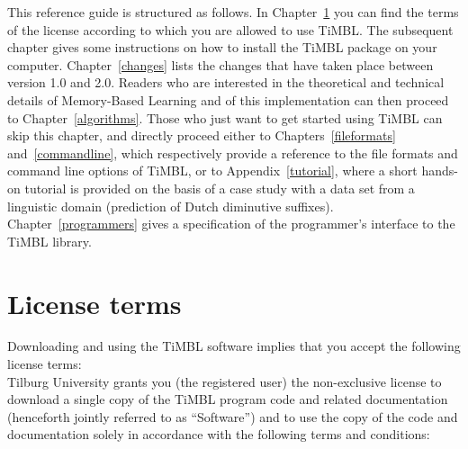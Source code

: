 \documentclass{report}
\begin{document}
This reference guide is structured as follows. In
Chapter~\ref{license} you can find the terms of the license according
to which you are allowed to use TiMBL. The subsequent chapter gives
some instructions on how to install the TiMBL package on your
computer. Chapter~\ref{changes} lists the changes that have taken
place between version 1.0 and 2.0. Readers who are interested in the
theoretical and technical details of Memory-Based Learning and of this
implementation can then proceed to Chapter~\ref{algorithms}. Those who
just want to get started using TiMBL can skip this chapter, and
directly proceed either to Chapters~\ref{fileformats}
and~\ref{commandline}, which respectively provide a reference to the
file formats and command line options of TiMBL, or to
Appendix~\ref{tutorial}, where a short hands-on tutorial is provided
on the basis of a case study with a data set from a linguistic domain
(prediction of Dutch diminutive suffixes). Chapter~\ref{programmers}
gives a specification of the programmer's interface to the TiMBL
library.

\chapter{License terms}
\label{license}

Downloading and using the TiMBL software implies that you accept the
following license terms:\\

Tilburg University grants you (the registered user) the non-exclusive
license to download a single copy of the TiMBL program code and
related documentation (henceforth jointly referred to as ``Software'')
and to use the copy of the code and documentation solely in accordance
with the following terms and conditions:
\end{document}

